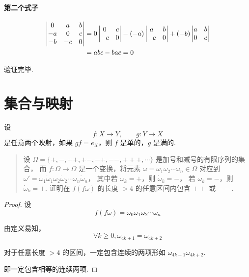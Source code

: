 \paragraph{第二个式子} %

\begin{equation}
\begin{aligned}
\begin{vmatrix}
    0 & a & b \\
    -a & 0 & c \\
    -b & -c & 0
\end{vmatrix} &= 0\begin{vmatrix}0 & c \\ -c & 0\end{vmatrix}
    -(-a)\begin{vmatrix}a & b \\ -c & 0\end{vmatrix}
    +(-b)\begin{vmatrix}a & b \\ 0 & c\end{vmatrix} \\
  &= abc - bac = 0
\end{aligned}
\end{equation}

验证完毕.


\section{集合与映射} %

\begin{lemma}\label{lem:ch01:sec05:1}
    设
    \[
        f: X \to Y, \qquad g: Y \to X
    \]
    是任意两个映射，如果 $gf = e_X$，则 $f$ 是单的，$g$ 是满的.
\end{lemma}

\begin{quotation}
    设 $\Omega = \{+,-,++,+-,-+,--,+++,\cdots\}$ 是加号和减号的有限序列的集合，
    而 $f: \Omega \to \Omega$ 是一个变换，将元素
    $\omega = \omega_1\omega_2\cdots\omega_n\in\Omega$
    对应到
    $\omega' = \omega_1\dot{\omega}_1\omega_2\dot{\omega}_2\cdots\omega_n\dot{\omega}_n$，
    其中若 $\omega_k=+$，则 $\dot{\omega}_k=-$，
    若 $\omega_k=-$，则 $\dot{\omega}_k=+$.
    证明在 $f(f\omega)$ 的长度 $>4$ 的任意区间内包含 $++$ 或 $--$.
\end{quotation}

\begin{proof}
    设
    \begin{equation}
        f(f\omega) = \omega_0\omega_1\omega_2\cdots\omega_n
    \end{equation}

    由定义易知，
    \begin{equation}
        \forall k \ge 0, \omega_{4k+1} = \omega_{4k+2}
    \end{equation}

    对于任意长度 $>4$ 的区间，一定包含连续的两项形如 $\omega_{4k+1}\omega_{4k+2}$.

    即一定包含相等的连续两项.
\end{proof}


